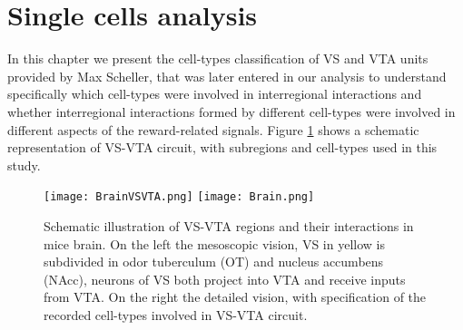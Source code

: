 
\section{Single cells analysis}
\label{chap:UnitsAnalysis}
In this chapter we present the cell-types classification of VS and VTA units provided by Max Scheller, that was later entered in our analysis to understand specifically which cell-types were involved in interregional interactions and whether interregional interactions formed by different cell-types were involved in different aspects of the reward-related signals. Figure \ref{fig:Brain} shows a schematic representation of VS-VTA circuit, with subregions and cell-types used in this study.\\
\begin{figure}[H]
    \centering
    \texttt{[image: BrainVSVTA.png]}
    \texttt{[image: Brain.png]}
    \caption{Schematic illustration of VS-VTA regions and their interactions in mice brain. On the left the mesoscopic vision, VS in yellow is subdivided in odor tuberculum (OT) and nucleus accumbens (NAcc), neurons of VS both project into VTA and receive inputs from VTA. On the right the detailed vision, with specification of the recorded cell-types involved in VS-VTA circuit.}
    \label{fig:Brain}
\end{figure}
